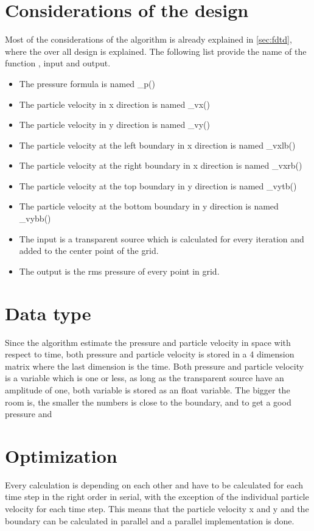 \section{Considerations of the design} \label{ch:considerations}
Most of the considerations of the algorithm is already explained in \autoref{sec:fdtd}, where the over all design is explained. The following list provide the name of the function , input and output. 

\begin{itemize}
\item The pressure formula is named _p() 
\item The particle velocity in x direction is named _vx()
\item The particle velocity in y direction is named _vy()
\item The particle velocity at the left boundary in x direction is named _vxlb()
\item The particle velocity at the right boundary in x direction is named _vxrb()
\item The particle velocity at the top boundary in y direction is named _vytb()
\item The particle velocity at the bottom boundary in y direction is named _vybb()
\item The input is a transparent source which is calculated for every iteration and added to the center point of the grid. 
\item The output is the \gls{rms} pressure of every point in grid.
\end{itemize}

\section{Data type}
Since the algorithm estimate the pressure and particle velocity in space with respect to time, both pressure and particle velocity is stored in a 4 dimension matrix where the last dimension is the time. Both pressure and particle velocity is a variable which is one or less, as long as the transparent source have an amplitude of one, both variable is stored as an float variable. The bigger the room is, the smaller the numbers is close to the boundary, and to get a good pressure and  



\section{Optimization}
Every calculation is depending on each other and have to be calculated for each time step in the right order in serial, with the exception of the individual particle velocity for each time step. This means that the particle velocity x and y and the boundary can be calculated in parallel and a parallel implementation is done.  